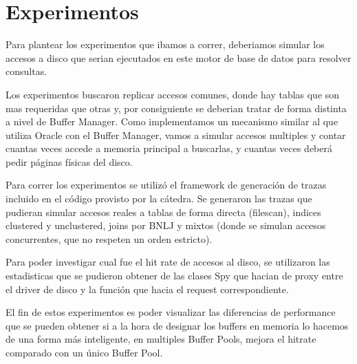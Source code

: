 \section{Experimentos}


Para plantear los experimentos que ibamos a correr, deberiamos simular los accesos a disco que serian ejecutados
en este motor de base de datos para resolver consultas.

Los experimentos buscaron replicar accesos comunes, donde hay tablas que son mas requeridas que otras y, por
consiguiente se deberian tratar de forma distinta a nivel de Buffer Manager. Como implementamos un mecanismo
similar al que utiliza Oracle con el Buffer Manager, vamos a simular accesos multiples y contar cuantas veces
accede a memoria principal a buscarlas, y cuantas veces deber\'a pedir p\'aginas f\'isicas del disco.

Para correr los experimentos se utiliz\'o el framework de generaci\'on de trazas incluido en el c\'odigo provisto
por la c\'atedra. Se generaron las trazas que pudieran simular accesos reales a tablas de forma directa (filescan),
indices clustered y unclustered, joins por BNLJ y mixtos (donde se simulan accesos concurrentes, que no respeten
un orden estricto).

Para poder investigar cual fue el hit rate de accesos al disco, se utilizaron las estadisticas que se pudieron
obtener de las clases Spy que hacian de proxy entre el driver de disco y la funci\'on que hacia el request
correspondiente. 

El fin de estos experimentos es poder visualizar las diferencias de performance que se pueden obtener si a la
hora de designar los buffers en memoria lo hacemos de una forma m\'as inteligente, en multiples Buffer Pools,
mejora el hitrate comparado con un \'unico Buffer Pool.
